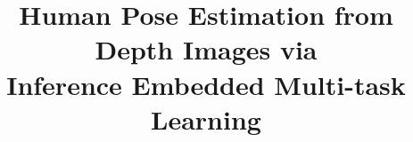 \documentclass{sig-alternate-05-2015}
\begin{document}


%
%
%

%

\title{Human Pose Estimation from Depth Images via \\
Inference Embedded Multi-task Learning}
%
%
%
%
%

%
\end{document}
